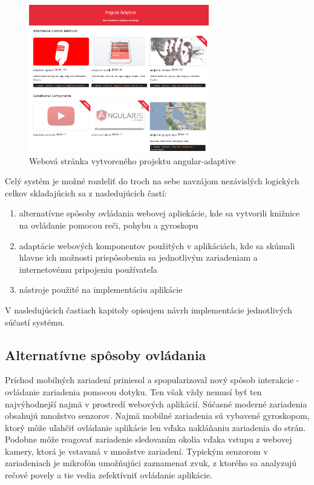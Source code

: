 \begin{figure}[H]
  \centering
  \includegraphics[width=0.7\textwidth]{img/angularadaptive.png}
  \caption[Webová stránka vytvoreného projektu angular-adaptive]{
    Webová stránka vytvoreného projektu angular-adaptive}
  \label{fig: angularadaptive}
\end{figure}

\newpage
Celý systém je možné rozdeliť do troch na sebe navzájom nezávislých logických celkov skladajúcich sa z nasledujúcich častí:

\begin{enumerate}
  \item alternatívne spôsoby ovládania webovej apliekácie, kde sa vytvorili knižnice na ovládanie pomocou reči, pohybu a gyroskopu
  \item adaptácie webových komponentov použitých v aplikáciách, kde sa skúmali hlavne ich možnosti prispôsobenia sa jednotlivým zariadeniam a internetovému pripojeniu používateľa
  \item nástroje použité na implementáciu aplikácie
\end{enumerate}

V nasledujúcich častiach kapitoly opisujem návrh implementácie jednotlivých súčastí systému.

\subsection{Alternatívne spôsoby ovládania} %
\label{sub:alternat_vne_sp_soby_ovl_dania}

Príchod mobilných zariadení priniesol a spopularizoval nový spôsob interakcie - ovládanie zariadenia pomocou dotyku. Ten však vždy nemusí byť ten najvýhodnejší najmä v prostredí webových aplikácií. Súčasné moderné zariadenia obsahujú množstvo senzorov. Najmä mobilné zariadenia sú vybavené gyroskopom, ktorý môže uľahčiť ovládanie aplikácie len vďaka nakláňaniu zariadenia do strán. Podobne môže reagovať zariadenie sledovaním okolia vďaka vstupu z webovej kamery, ktorá je vstavaná v množstve zariadení. Typickým senzorom v zariadeniach je mikrofón umožňujúci zaznamenať zvuk, z ktorého sa analyzujú rečové povely a tie vedia zefektívniť ovládanie aplikácie.

